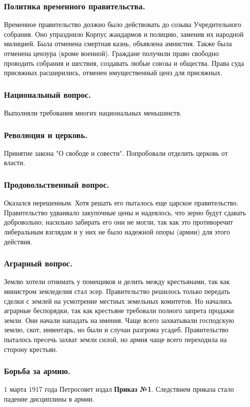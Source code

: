 \documentclass[12pt]{article}
\begin{document}
	\subsubsection{Политика временного правительства.}
	Временное правительство должно было действовать до созыва Учредительного собрания. Оно упразднило Корпус жандармов и полицию, заменив их народной милицией. Была отменена смертная казнь, объявлена амнистия. Также была отменена цензура (кроме военной). Граждане получили право свободно проводить собрания и шествия, создавать любые союзы и общества. Права суда присяжных расширились, отменен имущественный ценз для присяжных.
	\subsubsection{Национальный вопрос.}
	Выполняли требования многих национальных меньшинств.
	\subsubsection{Революция и церковь.}
	Принятие закона "О свободе и совести". Попробовали отделить церковь от власти.
	\subsubsection{Продовольственный вопрос.}
	Оказался нерешенным. Хотя решать его пыталось еще царское правительство. Правительство удваивало закупочные цены и надеялось, что зерно будут сдавать добровольно; насильно забирать его они не могли, так как это противоречит либеральным взглядам и у них не было надежной опоры (армии) для этого действия.
	\subsubsection{Аграрный вопрос.}
	Землю хотели отнимать у помещиков и делить между крестьянами, так как министром земледелия стал эсер. Правительство решилось только передать сделки с землей на усмотрение местных земельных комитетов. Но начались аграрные беспорядки, так как крестьяне требовали полного запрета продажи земли. Они начали нападать на имения. Чаще всего захватывали господскую землю, скот, инвентарь, но были и случаи разгрома усадеб. Правительство пыталось пресечь захват земли силой, но армия чаще всего переходила на сторону крестьян.
	\subsubsection{Борьба за армию.}
	$1$ марта $1917$ года Петросовет издал \textbf{Приказ №1}. Следствием приказа стало падение дисциплины в армии.
\end{document}
